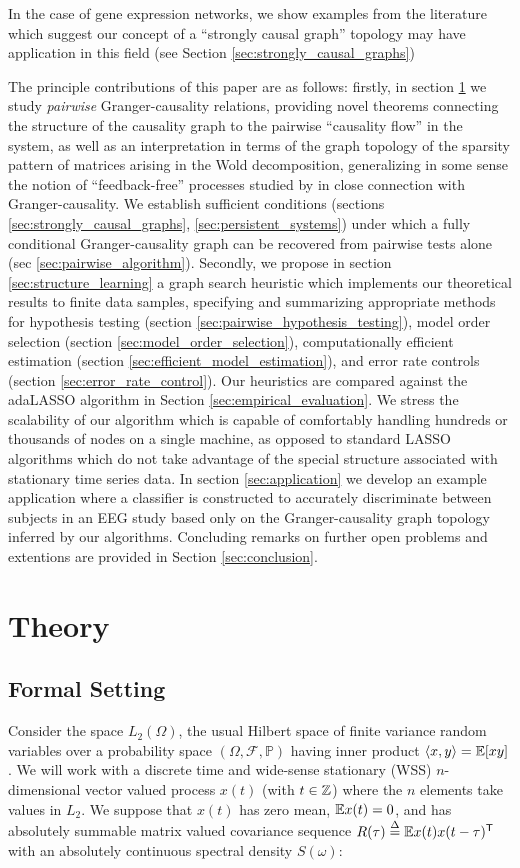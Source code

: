 \documentclass[12pt]{article}
\begin{document}
In the case of gene expression networks, we show examples from the
literature which suggest our concept of a ``strongly causal graph''
topology may have application in this field (see Section
\ref{sec:strongly_causal_graphs})

The principle contributions of this paper are as follows: firstly, in
section \ref{sec:theory} we study \textit{pairwise} Granger-causality
relations, providing novel theorems connecting the structure of the
causality graph to the pairwise ``causality flow'' in the system, as
well as an interpretation in terms of the graph topology of the
sparsity pattern of matrices arising in the Wold decomposition,
generalizing in some sense the notion of ``feedback-free'' processes
studied by \cite{caines1975feedback} in close connection with
Granger-causality.  We establish sufficient conditions (sections
\ref{sec:strongly_causal_graphs}, \ref{sec:persistent_systems}) under
which a fully conditional Granger-causality graph can be recovered
from pairwise tests alone (sec \ref{sec:pairwise_algorithm}).
Secondly, we propose in section \ref{sec:structure_learning} a graph
search heuristic which implements our theoretical results to finite
data samples, specifying and summarizing appropriate methods for
hypothesis testing (section \ref{sec:pairwise_hypothesis_testing}),
model order selection (section \ref{sec:model_order_selection}),
computationally efficient estimation (section
\ref{sec:efficient_model_estimation}), and error rate controls
(section \ref{sec:error_rate_control}).  Our heuristics are compared
against the adaLASSO algorithm in Section
\ref{sec:empirical_evaluation}.  We stress the scalability of our
algorithm which is capable of comfortably handling hundreds or
thousands of nodes on a single machine, as opposed to standard LASSO
algorithms which do not take advantage of the special structure
associated with stationary time series data.  In section
\ref{sec:application} we develop an example application where a
classifier is constructed to accurately discriminate between subjects
in an EEG study based only on the Granger-causality graph topology
inferred by our algorithms.  Concluding remarks on further open
problems and extentions are provided in Section \ref{sec:conclusion}.

\section{Theory}
\label{sec:theory}
\subsection{Formal Setting}
Consider the space $L_2(\Omega)$, the usual Hilbert space of finite
variance random variables over a probability space
$(\Omega, \mathcal{F}, \mathbb{P})$ having inner product
$\langle x, y \rangle = \mathbb{E}[xy]$.  We will work with a discrete time and
wide-sense stationary (WSS) $n$-dimensional vector valued process
$x(t)$ (with $t \in \mathbb{Z}$) where the $n$ elements take values in $L_2$.  We
suppose that $x(t)$ has zero mean, $\mathbb{E} x(t) = 0$, and has absolutely
summable matrix valued covariance sequence
$R(\tau) \overset{\Delta}{=} \mathbb{E} x(t)x(t - \tau)^{\mathsf{T}}$ with an absolutely
continuous spectral density $S(\omega)$:
\end{document}
